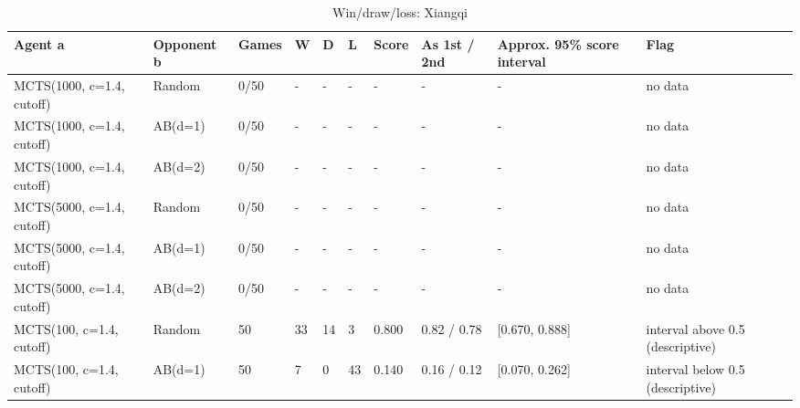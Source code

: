 \begin{table}[!t]
\centering
\caption{Win/draw/loss: Xiangqi}
\label{tab:wdl_xiangqi}
\small
\begin{tabular}{llllllllll}
\toprule
Agent a & Opponent b & Games & W & D & L & Score & As 1st / 2nd & Approx. 95\% score interval & Flag \\
\midrule
MCTS(1000, c=1.4, cutoff) & Random & 0/50 & - & - & - & - & - & - & no data \\
MCTS(1000, c=1.4, cutoff) & AB(d=1) & 0/50 & - & - & - & - & - & - & no data \\
MCTS(1000, c=1.4, cutoff) & AB(d=2) & 0/50 & - & - & - & - & - & - & no data \\
MCTS(5000, c=1.4, cutoff) & Random & 0/50 & - & - & - & - & - & - & no data \\
MCTS(5000, c=1.4, cutoff) & AB(d=1) & 0/50 & - & - & - & - & - & - & no data \\
MCTS(5000, c=1.4, cutoff) & AB(d=2) & 0/50 & - & - & - & - & - & - & no data \\
MCTS(100, c=1.4, cutoff) & Random & 50 & 33 & 14 & 3 & 0.800 & 0.82 / 0.78 & [0.670, 0.888] & interval above 0.5 (descriptive) \\
MCTS(100, c=1.4, cutoff) & AB(d=1) & 50 & 7 & 0 & 43 & 0.140 & 0.16 / 0.12 & [0.070, 0.262] & interval below 0.5 (descriptive) \\
\bottomrule
\end{tabular}
\end{table}
